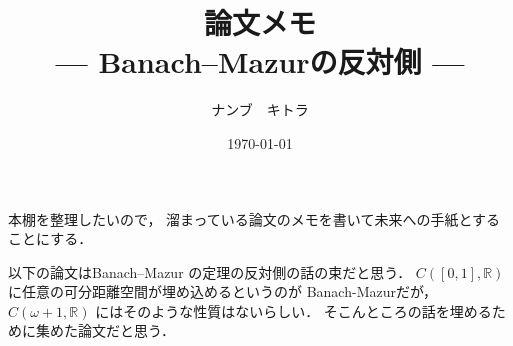 \documentclass[leqno, a4paper, 12pt]{jsarticle}
\title{論文メモ
\large{\\--- Banach--Mazurの反対側 ---}
}
\author{ナンブ　キトラ}
\date{\today}
\newcommand{\rr}{\mathbb{R}}
\begin{document}
\maketitle

本棚を整理したいので，
溜まっている論文のメモを書いて未来への手紙とすることにする．


以下の論文はBanach--Mazur
の定理の反対側の話の束だと思う．
$C([0, 1], \rr)$に任意の可分距離空間が埋め込めるというのが
Banach-Mazurだが，
$C(\omega+1, \rr)$
にはそのような性質はないらしい．
そこんところの話を埋めるために集めた論文だと思う．


\nocite{*}


\end{document}
